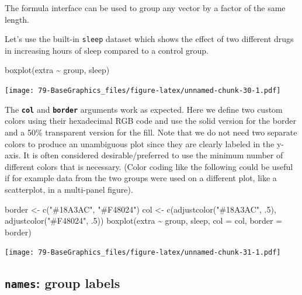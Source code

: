 \documentclass[
]{book}
\newenvironment{Shaded}{\begin{snugshade}}{\end{snugshade}}
\newcommand{\AttributeTok}[1]{\textcolor[rgb]{0.77,0.63,0.00}{#1}}
\newcommand{\DecValTok}[1]{\textcolor[rgb]{0.00,0.00,0.81}{#1}}
\newcommand{\FunctionTok}[1]{\textcolor[rgb]{0.00,0.00,0.00}{#1}}
\newcommand{\NormalTok}[1]{#1}
\newcommand{\OtherTok}[1]{\textcolor[rgb]{0.56,0.35,0.01}{#1}}
\newcommand{\SpecialCharTok}[1]{\textcolor[rgb]{0.00,0.00,0.00}{#1}}
\newcommand{\StringTok}[1]{\textcolor[rgb]{0.31,0.60,0.02}{#1}}
\begin{document}
The formula interface can be used to group any vector by a factor of the same length.

Let's use the built-in \texttt{sleep} dataset which shows the effect of two different drugs in increasing hours of sleep compared to a control group.

\begin{Shaded}
\begin{Highlighting}[]
\FunctionTok{boxplot}\NormalTok{(extra }\SpecialCharTok{\textasciitilde{}}\NormalTok{ group, sleep)}
\end{Highlighting}
\end{Shaded}

\texttt{[image: 79-BaseGraphics\_files/figure-latex/unnamed-chunk-30-1.pdf]}

The \textbf{\texttt{col}} and \textbf{\texttt{border}} arguments work as expected. Here we define two custom colors using their hexadecimal RGB code and use the solid version for the border and a 50\% transparent version for the fill. Note that we do not need two separate colors to produce an unambiguous plot since they are clearly labeled in the y-axis. It is often considered desirable/preferred to use the minimum number of different colors that is necessary. (Color coding like the following could be useful if for example data from the two groups were used on a different plot, like a scatterplot, in a multi-panel figure).

\begin{Shaded}
\begin{Highlighting}[]
\NormalTok{border }\OtherTok{\textless{}{-}} \FunctionTok{c}\NormalTok{(}\StringTok{"\#18A3AC"}\NormalTok{, }\StringTok{"\#F48024"}\NormalTok{)}
\NormalTok{col }\OtherTok{\textless{}{-}} \FunctionTok{c}\NormalTok{(}\FunctionTok{adjustcolor}\NormalTok{(}\StringTok{"\#18A3AC"}\NormalTok{, .}\DecValTok{5}\NormalTok{), }\FunctionTok{adjustcolor}\NormalTok{(}\StringTok{"\#F48024"}\NormalTok{, .}\DecValTok{5}\NormalTok{))}
\FunctionTok{boxplot}\NormalTok{(extra }\SpecialCharTok{\textasciitilde{}}\NormalTok{ group, sleep,}
        \AttributeTok{col =}\NormalTok{ col, }\AttributeTok{border =}\NormalTok{ border)}
\end{Highlighting}
\end{Shaded}

\texttt{[image: 79-BaseGraphics\_files/figure-latex/unnamed-chunk-31-1.pdf]}

\hypertarget{names-group-labels}{%
\subsection{\texorpdfstring{\textbf{\texttt{names}}: group labels}{names: group labels}}\label{names-group-labels}}
\end{document}
